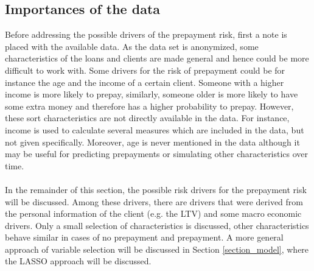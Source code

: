 \subsection{Importances of the data}
    Before addressing the possible drivers of the prepayment risk, 
    first a note is placed with the available data.  
    As the data set is anonymized, some characteristics of the loans and 
    clients are made general and hence could be more difficult to work with. 
    Some drivers for the risk of prepayment could be 
    for instance the age and the income of a certain client. 
    Someone with a 
    higher income is more likely to prepay, similarly, someone older is 
    more likely to have some extra money and therefore has a higher 
    probability to prepay. 
    However, these sort characteristics are not directly available in the 
    data.
    For instance,
    income is used to calculate several measures which are included in the
    data, but not given specifically. 
    Moreover, age is never mentioned in the data although it 
    may be useful for predicting prepayments or simulating other 
    characteristics over time.  
    \\\\
    In the remainder of this section, the possible risk drivers 
    for the prepayment risk will be discussed. Among these drivers, 
    there are drivers that were derived from the personal information
    of the client (e.g. the LTV) and some macro economic drivers. 
    Only a small selection of characteristics is discussed, other 
    characteristics behave similar in cases of no prepayment and 
    prepayment. 
    A more general approach of variable selection will  be discussed 
    in Section \ref{section_model}, where the LASSO approach will
    be discussed. 
    
